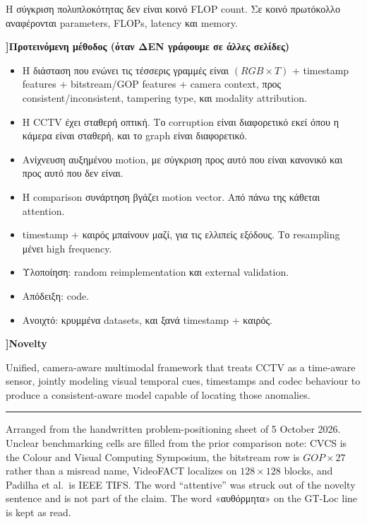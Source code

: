 \documentclass[11pt,a4paper]{article}
\newcommand{\slot}[1]{%
  \par\vspace{0.72em}%
  {\sffamily\bfseries\color{accent}\large ]\enspace #1}\par\vspace{0.18em}%
}
\begin{document}
Η σύγκριση πολυπλοκότητας δεν είναι κοινό FLOP count. Σε κοινό πρωτόκολλο αναφέρονται parameters, FLOPs, latency και memory.

\slot{Προτεινόμενη μέθοδος (όταν ΔΕΝ γράφουμε σε άλλες σελίδες)}

\begin{itemize}
  \item Η διάσταση που ενώνει τις τέσσερις γραμμές είναι \((RGB \times T)\) + timestamp features + bitstream/GOP features + camera context, προς consistent/inconsistent, tampering type, και modality attribution.
  \item Η CCTV έχει σταθερή οπτική. Το corruption είναι διαφορετικό εκεί όπου η κάμερα είναι σταθερή, και το graph είναι διαφορετικό.
  \item Ανίχνευση αυξημένου motion, με σύγκριση προς αυτό που είναι κανονικό και προς αυτό που δεν είναι.
  \item Η comparison συνάρτηση βγάζει motion vector. Από πάνω της κάθεται attention.
  \item timestamp + καιρός μπαίνουν μαζί, για τις ελλιπείς εξόδους. Το resampling μένει high frequency.
  \item Υλοποίηση: random reimplementation και external validation.
  \item Απόδειξη: code.
  \item Ανοιχτό: κρυμμένα datasets, και ξανά timestamp + καιρός.
\end{itemize}

\slot{Novelty}

Unified, camera-aware multimodal framework that treats CCTV as a time-aware sensor, jointly modeling visual temporal cues, timestamps and codec behaviour to produce a consistent-aware model capable of locating those anomalies.

\vspace{1.1em}
{\color{rule}\rule{\linewidth}{0.4pt}}
\vspace{0.35em}
{\footnotesize\color{accent} Arranged from the handwritten problem-positioning sheet of 5 October 2026. Unclear benchmarking cells are filled from the prior comparison note: CVCS is the Colour and Visual Computing Symposium, the bitstream row is \(GOP \times 27\) rather than a misread name, VideoFACT localizes on \(128\times128\) blocks, and Padilha et al.\ is IEEE TIFS. The word ``attentive'' was struck out of the novelty sentence and is not part of the claim. The word «αυθόρμητα» on the GT-Loc line is kept as read.}
\end{document}
